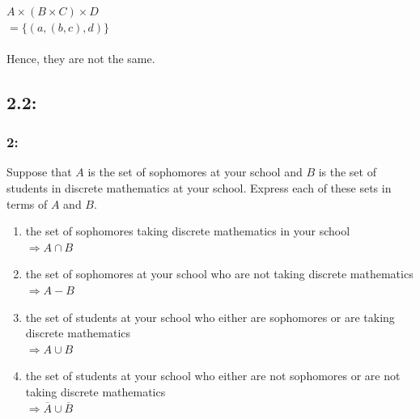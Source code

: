 \documentclass[12pt,en,a4paper]{article}
\begin{document}
	$A\times(B\times C)\times D$\\
	$=\{(a,(b,c),d)\}$\\\\
	Hence, they are not the same.
\newpage
{}
	\subsection*{2.2:}
	\subsubsection*{2:}
	Suppose that $A$ is the set of sophomores at your school and $B$ is the set of students in discrete mathematics at your school. Express each of these sets in terms of $A$ and $B$.
	\begin{enumerate}[label=\textbf{\alph*)}]
		\item the set of sophomores taking discrete mathematics in your school\\
		$\Rightarrow A\cap B$
		\item the set of sophomores at your school who are not taking discrete mathematics\\
		$\Rightarrow A-B$
		\item the set of students at your school who either are sophomores or are taking discrete mathematics\\
		$\Rightarrow A\cup B$
		\item the set of students at your school who either are not sophomores or are not taking discrete mathematics\\
		$\Rightarrow \overline{A}\cup \overline{B}$
	\end{enumerate}
\end{document}
